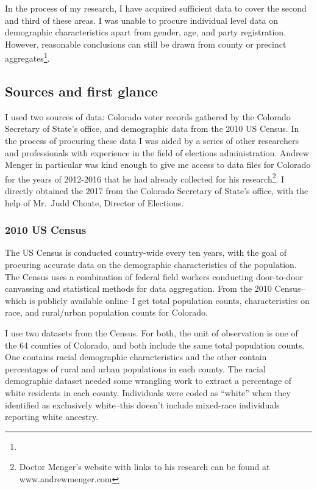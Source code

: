 \documentclass[12pt,twoside]{reedthesis}
\begin{document}
  In the process of my research, I have acquired sufficient data to cover
  the second and third of these areas. I was unable to procure individual
  level data on demographic characteristics apart from gender, age, and
  party registration. However, reasonable conclusions can still be drawn
  from county or precinct aggregates\footnote{}.
  
  \subsection{Sources and first glance}\label{sources-and-first-glance}
  
  I used two sources of data: Colorado voter records gathered by the
  Colorado Secretary of State's office, and demographic data from the 2010
  US Census. In the process of procuring these data I was aided by a
  series of other researchers and professionals with experience in the
  field of elections administration. Andrew Menger in particular was kind
  enough to give me access to data files for Colorado for the years of
  2012-2016 that he had already collected for his research\footnote{Doctor
    Menger's website with links to his research can be found at
    www.andrewmenger.com}. I directly obtained the 2017 from the Colorado
  Secretary of State's office, with the help of Mr.~Judd Choate, Director
  of Elections.
  
  \subsubsection{2010 US Census}\label{us-census}
  
  The US Census is conducted country-wide every ten years, with the goal
  of procuring accurate data on the demographic characteristics of the
  population. The Census uses a combination of federal field workers
  conducting door-to-door canvassing and statistical methods for data
  aggregation. From the 2010 Census--which is publicly available online--I
  get total population counts, characteristics on race, and rural/urban
  population counts for Colorado.
  
  I use two datasets from the Census. For both, the unit of observation is
  one of the 64 counties of Colorado, and both include the same total
  population counts. One contains racial demographic characteristics and
  the other contain percentages of rural and urban populations in each
  county. The racial demographic dataset needed some wrangling work to
  extract a percentage of white residents in each county. Individuals were
  coded as ``white'' when they identified as exclusively white--this
  doesn't include mixed-race individuals reporting white ancestry.
  
\end{document}
